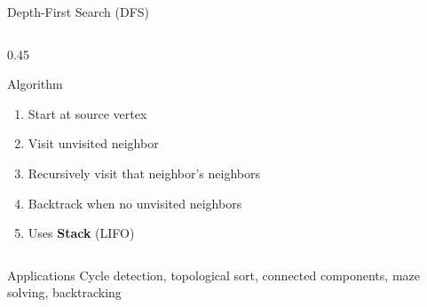 \documentclass[aspectratio=169,xcolor=dvipsnames]{beamer}
\begin{document}
\begin{frame}{Depth-First Search (DFS)}
  \begin{columns}
    \begin{column}{0.45\textwidth}
      \begin{block}{Algorithm}
        \begin{enumerate}
          \item Start at source vertex
          \item Visit unvisited neighbor
          \item Recursively visit that neighbor's neighbors
          \item Backtrack when no unvisited neighbors
          \item Uses \textbf{Stack} (LIFO)
        \end{enumerate}
      \end{block}

      \begin{center}
      \end{center}
    \end{column}





  \end{columns}

  \begin{exampleblock}{Applications}
    Cycle detection, topological sort, connected components, maze solving, backtracking
  \end{exampleblock}
\end{frame}
\end{document}
